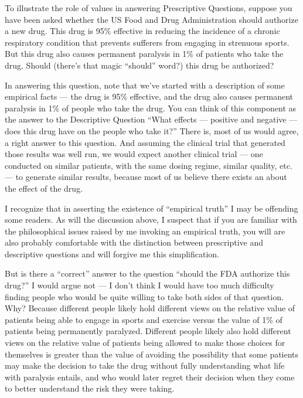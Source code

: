 \documentclass[letterpaper,10pt,english]{jupyterBook}
\begin{document}
\sphinxAtStartPar
To illustrate the role of values in answering Prescriptive Questions, suppose you have been asked whether the US Food and Drug Administration should authorize a new drug. This drug is 95\% effective in reducing the incidence of a chronic respiratory condition that prevents sufferers from engaging in strenuous sports. But this drug also causes permanent paralysis in 1\% of patients who take the drug. Should (there’s that magic “should” word?) this drug be authorized?

\sphinxAtStartPar
In answering this question, note that we’ve started with a description of some empirical facts — the drug is 95\% effective, and the drug also causes permanent paralysis in 1\% of people who take the drug. You can think of this component as the answer to the Descriptive Question “What effects — positive and negative — does this drug have on the people who take it?” There is, most of us would agree, a right answer to this question. And assuming the clinical trial that generated those results was well run, we would expect another clinical trial — one conducted on similar patients, with the same dosing regime, similar quality, etc. — to generate similar results, because most of us believe there exists an  about the effect of the drug.%
\begin{footnote}[2]\sphinxAtStartFootnote
I recognize that in asserting the existence of “empirical truth” I may be offending some readers. As will the discussion above, I suspect that if you are familiar with the philosophical issues raised by me invoking an empirical truth, you will are also probably comfortable with the distinction between prescriptive and descriptive questions and will forgive me this simplification.
%
\end{footnote}

\sphinxAtStartPar
But is there a “correct” answer to the question “should the FDA authorize this drug?” I would argue not — I don’t think I would have too much difficulty finding people who would be quite willing to take both sides of that question. Why? Because different people likely hold different views on the relative value of patients being able to engage in sports and exercise versus the value of 1\% of patients being permanently paralyzed. Different people likely also hold different views on the relative value of patients being allowed to make those choices for themselves is greater than the value of avoiding the possibility that some patients may make the decision to take the drug without fully understanding what life with paralysis entails, and who would later regret their decision when they come to better understand the risk they were taking.
\end{document}
